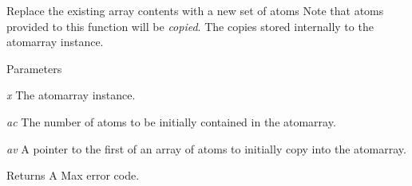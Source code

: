 Replace the existing array contents with a new set of atoms Note that atoms provided to this function will be {\itshape copied\/}. The copies stored internally to the atomarray instance.


\begin{DoxyParams}{Parameters}
\item[{\em x}]The atomarray instance. \item[{\em ac}]The number of atoms to be initially contained in the atomarray. \item[{\em av}]A pointer to the first of an array of atoms to initially copy into the atomarray. \end{DoxyParams}
\begin{DoxyReturn}{Returns}
A Max error code. 
\end{DoxyReturn}
